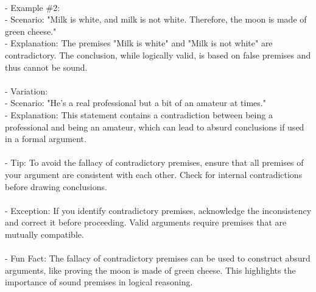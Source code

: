 \documentclass[a4paper,12pt,single,pdftex]{scrbook}
\begin{document}
      
        
      \\

      
        - Example \#2:
      \\

      
          - Scenario: "Milk is white, and milk is not white. Therefore, the moon is made of green cheese."
      \\

      
          - Explanation: The premises "Milk is white" and "Milk is not white" are contradictory. The conclusion, while logically valid, is based on false premises and thus cannot be sound.
      \\

      
        
      \\

      
        - Variation:
      \\

      
          - Scenario: "He’s a real professional but a bit of an amateur at times."
      \\

      
          - Explanation: This statement contains a contradiction between being a professional and being an amateur, which can lead to absurd conclusions if used in a formal argument.
      \\

      
        
      \\

      
        - Tip: To avoid the fallacy of contradictory premises, ensure that all premises of your argument are consistent with each other. Check for internal contradictions before drawing conclusions.
      \\

      
        
      \\

      
        - Exception: If you identify contradictory premises, acknowledge the inconsistency and correct it before proceeding. Valid arguments require premises that are mutually compatible.
      \\

      
        
      \\

      
        - Fun Fact: The fallacy of contradictory premises can be used to construct absurd arguments, like proving the moon is made of green cheese. This highlights the importance of sound premises in logical reasoning.
      \\
\end{document}
